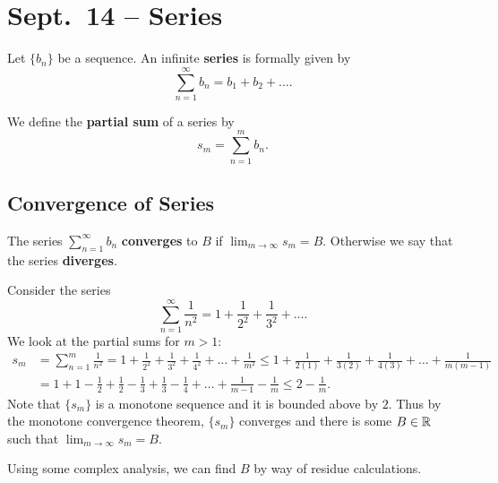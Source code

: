 \chapter{Sept.~14 -- Series}

\begin{definition}
  Let $\{b_n\}$ be a sequence. An infinite \textbf{series}
  is formally given by
  \[
    \sum_{n = 1}^\infty b_n = b_1 + b_2 + \dots
  .\]
\end{definition}

\begin{definition}
  We define the \textbf{partial sum} of a series by
  \[s_m = \sum_{n = 1}^m b_n.\]
\end{definition}

\section{Convergence of Series}

\begin{definition}
  The series $\sum_{n=1}^\infty{b_n}$ \textbf{converges}
  to $B$ if $\lim_{m \to \infty} s_m = B$. Otherwise
  we say that the series \textbf{diverges}.
\end{definition}

\begin{example}
  Consider the series
  \[\sum_{n = 1}^{\infty} \frac{1}{n^2} = 1 + \frac{1}{2^2} + \frac{1}{3^2} + \dots.\]
  We look at the partial sums for $m > 1$:
  \begin{align*}
    s_m &= \sum_{n = 1}^{m} \frac{1}{n^2} = 1 + \frac{1}{2^2} + \frac{1}{3^2} + \frac{1}{4^2} + \dots + \frac{1}{m^2}
    \le 1 + \frac{1}{2(1)} + \frac{1}{3(2)} + \frac{1}{4(3)} + \dots + \frac{1}{m(m-1)} \\
        &= 1 + 1 - \frac{1}{2} + \frac{1}{2} - \frac{1}{3} + \frac{1}{3} - \frac{1}{4} + \dots + \frac{1}{m-1} - \frac{1}{m}
        \le 2 - \frac{1}{m}.
  \end{align*}
  Note that $\{s_m\}$ is a monotone sequence and it is
  bounded above by $2$. Thus by the monotone convergence
  theorem, $\{s_m\}$ converges and there is some
  $B \in \mathbb{R}$ such that
  $\lim_{m \to \infty} s_m = B$.
\end{example}

\begin{remark}
  Using some complex analysis, we can find $B$ by way of
  residue calculations.
\end{remark}

